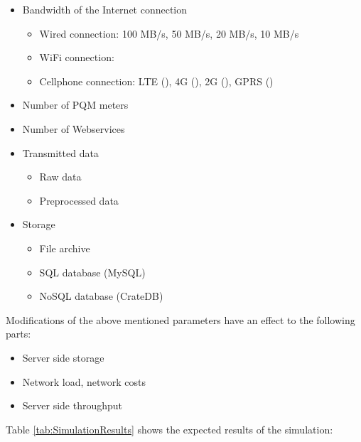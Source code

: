 \begin{itemize}
	\item Bandwidth of the Internet connection
		\begin{itemize}
			\item Wired connection: 100 MB/s, 50 MB/s, 20 MB/s, 10 MB/s
			\item WiFi connection: 
			\item Cellphone connection: LTE (), 4G (), 2G (), GPRS ()
		\end{itemize}
	\item Number of PQM meters
	\item Number of Webservices
	\item Transmitted data
		\begin{itemize}
			\item Raw data
			\item Preprocessed data
		\end{itemize}
  \item Storage
		\begin{itemize}
			\item File archive
			\item SQL database (MySQL)
			\item NoSQL database (CrateDB)
		\end{itemize}		
\end{itemize}

Modifications of the above mentioned parameters have an effect to the following parts:

\begin{itemize}
	\item Server side storage
	\item Network load, network costs
	\item Server side throughput
\end{itemize}

Table \ref{tab:SimulationResults} shows the expected results of the simulation:


